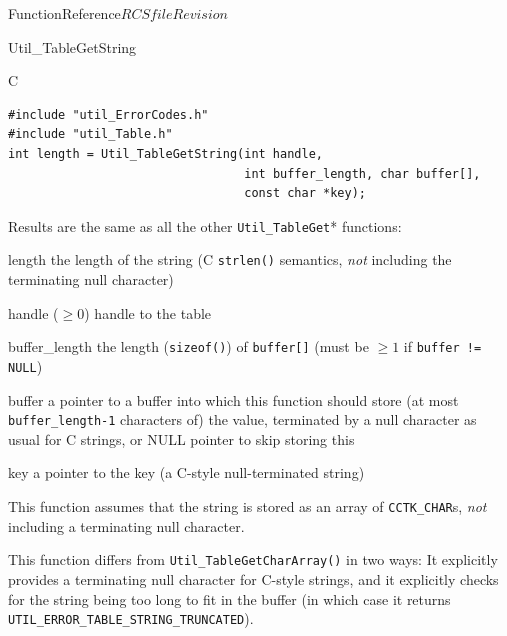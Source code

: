 \begin{cactuspart}{FunctionReference}{$RCSfile$}{$Revision$}
\begin{FunctionDescription}{Util\_TableGetString}
\begin{SynopsisSection}
\begin{Synopsis}{C}
\begin{verbatim}
#include "util_ErrorCodes.h"
#include "util_Table.h"
int length = Util_TableGetString(int handle,
                                 int buffer_length, char buffer[],
                                 const char *key);
\end{verbatim}
\end{Synopsis}
\end{SynopsisSection}

\begin{ResultSection}
\begin{ResultNote}
Results are the same as all the other \verb|Util_TableGet|* functions:
\end{ResultNote}
\begin{Result}{length}
the length of the string
(C \verb|strlen()| semantics, \ie{} {\em not\/} including
the terminating null character)
\end{Result}
\end{ResultSection}

\begin{ParameterSection}
\begin{Parameter}{handle ($\ge 0$)}
handle to the table
\end{Parameter}
\begin{Parameter}{buffer\_length}
the length (\verb|sizeof()|) of \verb|buffer[]|
(must be $\ge 1$ if \verb|buffer != NULL|)
\end{Parameter}
\begin{Parameter}{buffer}
a pointer to a buffer into which this function should store
(at most \verb|buffer_length-1|  characters of) the value,
terminated by a null character as usual for C strings,
or NULL pointer to skip storing this
\end{Parameter}
\begin{Parameter}{key}
a pointer to the key (a C-style null-terminated string)
\end{Parameter}
\end{ParameterSection}

\begin{Discussion}
This function assumes that the string is stored as an array of
\verb|CCTK_CHAR|s, {\em not\/} including a terminating null character.

This function differs from \verb|Util_TableGetCharArray()| in two ways:
It explicitly provides a terminating null character for C-style strings,
and it explicitly checks for the string being too long to fit in the buffer
(in which case it returns \verb|UTIL_ERROR_TABLE_STRING_TRUNCATED|).


\end{Discussion}
\end{FunctionDescription}
\end{cactuspart}
